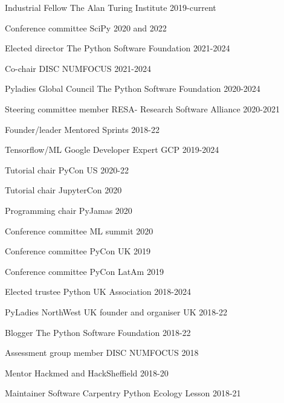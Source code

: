 


\begin{cvpress}

\cvpres
{Industrial Fellow}
{The Alan Turing Institute}
{2019-current}

\cvpres
{Conference committee}
{SciPy}
{2020 and 2022}

\cvpres
{Elected director}
{The Python Software Foundation}
{2021-2024}

\cvpres
{Co-chair}
{DISC NUMFOCUS}
{2021-2024}

\cvpres
{Pyladies Global Council}
{The Python Software Foundation}
{2020-2024}

\cvpres
{Steering committee member}
{RESA- Research Software Alliance}
{2020-2021}

\cvpres
{Founder/leader}
{Mentored Sprints}
{2018-22}

\cvpres
{Tensorflow/ML Google Developer Expert}
{GCP}
{2019-2024}

\cvpres
{Tutorial chair}
{PyCon US}
{2020-22}

\cvpres
{Tutorial chair}
{JupyterCon}
{2020}

\cvpres
{Programming chair}
{PyJamas}
{2020}

\cvpres
{Conference committee}
{ML summit}
{2020}

\cvpres
{Conference committee}
{PyCon UK}
{2019}

\cvpres
{Conference committee}
{PyCon LatAm}
{2019}

\cvpres
{Elected trustee} %
{Python UK Association}
{2018-2024}

\cvpres
{PyLadies NorthWest UK founder and organiser} %
{UK}
{2018-22}

\cvpres
{Blogger} %
{The Python Software Foundation}
{2018-22}

\cvpres
{Assessment group member}
{DISC NUMFOCUS}
{2018}

\cvpres
{Mentor}
{Hackmed and HackSheffield}
{2018-20}

\cvpres
{Maintainer} %
{Software Carpentry Python Ecology Lesson}
{2018-21}


\end{cvpress}
